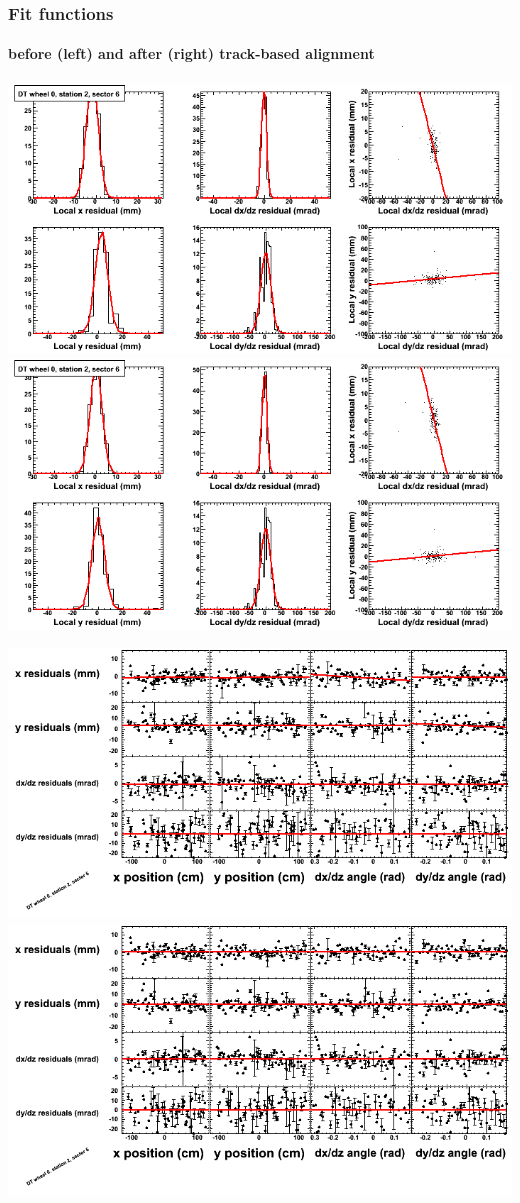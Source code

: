 \documentclass[compress]{beamer}
\begin{document}
\begin{frame}
\frametitle{Fit functions}
\framesubtitle{before (left) and after (right) track-based alignment}
\includegraphics[width=0.5\linewidth]{fitfunctions_re01/MBwhCst2sec06_bellcurves.png} \includegraphics[width=0.5\linewidth]{fitfunctions_re05/MBwhCst2sec06_bellcurves.png}

\includegraphics[width=0.5\linewidth]{fitfunctions_re01/MBwhCst2sec06_polynomials.png} \includegraphics[width=0.5\linewidth]{fitfunctions_re05/MBwhCst2sec06_polynomials.png}
\end{frame}
\end{document}
